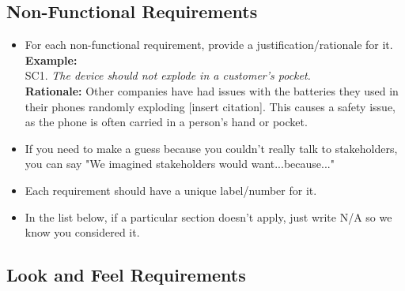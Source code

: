 \documentclass[]{article}
\begin{document}
\begin{enumerate}[{\bf BE1.}]

\section{Non-Functional Requirements}
\label{sec:non-functional_requirements}


\begin{itemize}
	\item For each non-functional requirement, provide a justification/rationale for it.\\
	{\bf Example:} \\
	SC1. \emph{The device should not explode in a customer’s pocket.}\\
	{\bf Rationale:} Other companies have had issues with the batteries they used in their phones randomly exploding [insert citation]. This causes a safety issue, as the phone is often carried in a person's hand or pocket.	
	\item If you need to make a guess because you couldn't really talk to stakeholders, you can say "We imagined stakeholders would want...because..."
	\item Each requirement should have a unique label/number for it.
	\item In the list below, if a particular section doesn't apply, just write N/A so we know you considered it.
\end{itemize}

\subsection{Look and Feel Requirements}
\label{sub:look_and_feel_requirements}


\end{enumerate}
\end{document}
